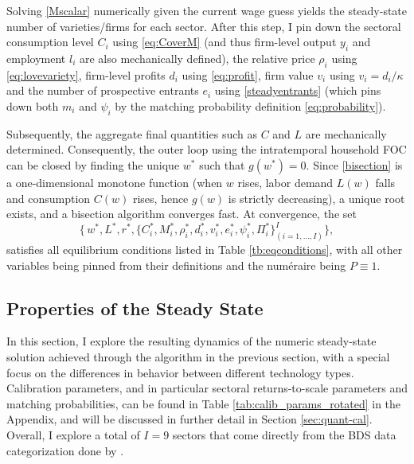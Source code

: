 \documentclass[a4paper,12pt]{article} %
\numberwithin{equation}{section} %
\numberwithin{figure}{section}
\numberwithin{table}{section}
\begin{document}
Solving \eqref{Mscalar} numerically given the current wage guess yields the
steady-state number of varieties/firms for each sector. After this step, I pin down the sectoral consumption level $C_i$ using 
\eqref{eq:CoverM} (and thus firm-level output $y_i$ and employment $l_i$ are also mechanically defined), the relative 
price $\rho_i$ using \eqref{eq:lovevariety}, firm-level profits $d_i$ using \eqref{eq:profit}, firm value $v_i$ using 
$v_i = d_i/\kappa$ and the number of prospective entrants $e_i$ using \eqref{steadyentrants} (which pins down both $m_i$
and $\psi_i$ by the matching probability definition \eqref{eq:probability}).

Subsequently, the aggregate final quantities such as $C$ and $L$ are mechanically determined. Consequently, the outer loop
using the intratemporal household FOC can be closed by finding the unique $w^*$ such that $g(w^*)= 0$. Since \eqref{bisection} is a 
one-dimensional monotone function (when $w$ rises, labor demand $L(w)$ falls and consumption $C(w)$ rises, 
hence $g(w)$ is strictly decreasing), a unique root exists, and a bisection algorithm converges fast. At convergence, the set
\[
\bigl\{\,w^*,L^*,r^*,\bigl\{
        C_i^*,M_i^*,\rho_i^*,d_i^*,v_i^*,e_i^*, \psi_i^*,\Pi_i^*\bigr\}^I_{(i=1,\dots,I)}\bigr\},
\]
satisfies all equilibrium conditions listed in Table \ref{tb:eqconditions}, with all other variables being 
pinned from their definitions and the numéraire being $P \equiv 1$.


\subsection{Properties of the Steady State}
\label{sec:solution-properties}

In this section, I explore the resulting dynamics of the numeric steady-state solution achieved through the 
algorithm in the previous section, with a special focus on the differences in behavior between different technology types.
Calibration parameters, and in particular sectoral returns-to-scale parameters and matching probabilities,
can be found in Table \ref{tab:calib_params_rotated} in the Appendix, and will be discussed in further detail in 
Section \ref{sec:quant-cal}. Overall, I explore a total of $I = 9$ sectors that come directly from the BDS data 
categorization done by \textcite{sedlavcek2017growth}.
\end{document}

